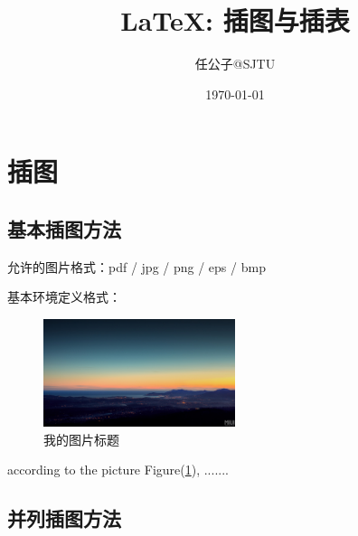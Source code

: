 \documentclass[12pt]{elegantpaper} %
\title{\LaTeX : 插图与插表}
\author{任公子@SJTU}
\date{\today}
\begin{document}
\maketitle   %
\newpage
\section{插图}




\subsection{基本插图方法}


允许的图片格式：pdf / jpg / png / eps / bmp

基本环境定义格式：
\renewcommand{\figurename}{图 }

\begin{figure}[htbp]	
	\centering	
	\includegraphics[width=0.5\textwidth]{figure/demo.jpg}	
	\caption{我的图片标题}	
    \label{demo1}      %
\end{figure}


according to the picture Figure(\ref{demo1}), .......


\subsection{并列插图方法}
\end{document}
